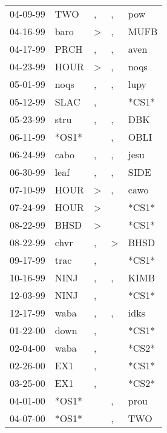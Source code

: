 \begin{supertabular}{lllll}
 04-09-99 &    TWO &                , &                , &    pow \\
 04-16-99 &   baro &     \textgreater &                , &   MUFB \\
 04-17-99 &   PRCH &                , &                , &   aven \\
 04-23-99 &   HOUR &     \textgreater &                , &   noqs \\
 05-01-99 &   noqs &                , &                , &   lupy \\
 05-12-99 &   SLAC &                , &                  &  *CS1* \\
 05-23-99 &   stru &                , &                , &    DBK \\
 06-11-99 &  *OS1* &                  &                , &   OBLI \\
 06-24-99 &   cabo &                , &                , &   jesu \\
 06-30-99 &   leaf &                , &                , &   SIDE \\
 07-10-99 &   HOUR &     \textgreater &                , &   cawo \\
 07-24-99 &   HOUR &     \textgreater &                  &  *CS1* \\
 08-22-99 &   BHSD &     \textgreater &                  &  *CS1* \\
 08-22-99 &   chvr &                , &     \textgreater &   BHSD \\
 09-17-99 &   trac &                , &                  &  *CS1* \\
 10-16-99 &   NINJ &                , &                , &   KIMB \\
 12-03-99 &   NINJ &                , &                  &  *CS1* \\
 12-17-99 &   waba &                , &                , &   idks \\
 01-22-00 &   down &                , &                  &  *CS1* \\
 02-04-00 &   waba &                , &                  &  *CS2* \\
 02-26-00 &    EX1 &                , &                  &  *CS1* \\
 03-25-00 &    EX1 &                , &                  &  *CS2* \\
 04-01-00 &  *OS1* &                  &                , &   prou \\
 04-07-00 &  *OS1* &                  &                , &    TWO \\

\end{supertabular}
